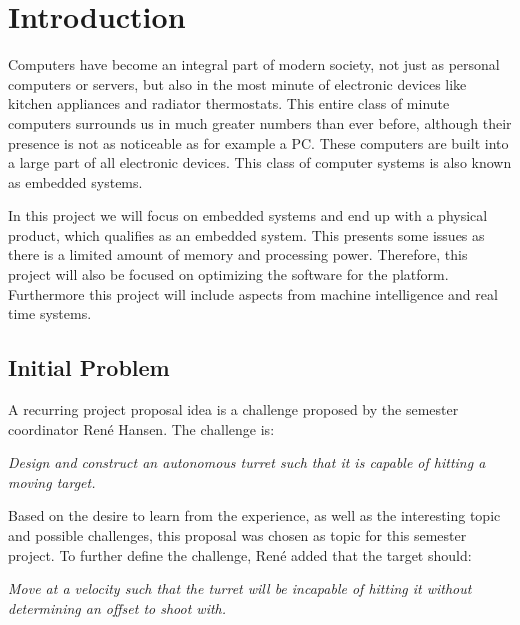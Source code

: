 \chapter{Introduction}
Computers have become an integral part of modern society, not just as personal
computers or servers, but also in the most minute of electronic devices
like kitchen appliances and radiator thermostats. This entire class of minute
computers surrounds us in much greater numbers than ever before, although their
presence is not as noticeable as for example a PC. These computers are built
into a large part of all electronic devices. This class of computer systems is
also known as embedded systems.\nl

In this project we will focus on embedded systems and end up with a physical product, which qualifies as an embedded system. This presents some issues
as there is a limited amount of memory and processing power. Therefore, this project will also be focused on optimizing the software for the platform. Furthermore this project will include aspects from machine intelligence and real time systems. 

\section{Initial Problem}
A recurring project proposal idea is a challenge proposed by the semester coordinator Ren\'e
Hansen. The challenge is:

\begin{center}
\begin{minipage}{0.8\linewidth}
\textit{Design and construct an autonomous turret such that it is capable of
hitting a moving target.}
\end{minipage}
\end{center}

Based on the desire to learn from the experience, as well as the interesting
topic and possible challenges, this proposal was chosen as topic for this
semester project. To further define the challenge, Ren\'e added that the target
should:
\begin{center}
\begin{minipage}{0.8\linewidth}
\textit{Move at a velocity such that the turret will be incapable
of hitting it without determining an offset to shoot with.}
\end{minipage}
\end{center}

